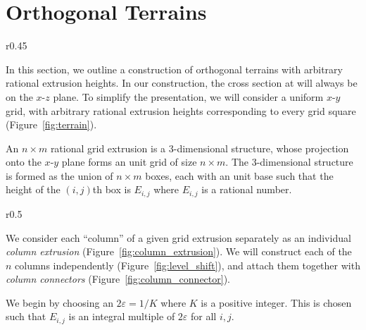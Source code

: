 \section{Orthogonal Terrains}
\label{sec:orthogonal_terrains}

\graphicspath{{./notebooks/}}%
\begin{wrapfigure}[7]{r}{0.45\textwidth}
    \vspace{-2.7em}
    \def\svgwidth{0.45\textwidth}
    
    \caption{Example orthogonal terrain.}
    \label{fig:terrain}
    \vspace{-1.2em}
\end{wrapfigure}
In this section, we outline a construction of orthogonal terrains with arbitrary rational extrusion heights.
In our construction, the cross section at will always be on the $x$-$z$ plane.
To simplify the presentation, we will consider a uniform $x$-$y$ grid,
with arbitrary rational extrusion heights corresponding to every grid square (Figure~\ref{fig:terrain}).
\begin{definition}
An $n\times m$ rational grid extrusion is a 3-dimensional structure,
whose projection onto the $x$-$y$ plane forms an unit grid of size $n\times m$.
The 3-dimensional structure is formed as the union of $n\times m$ boxes, each with an unit base
such that the height of the $(i,j)$th box is $E_{i,j}$ where $E_{i, j}$ is a rational number.
\end{definition}

\graphicspath{{./figures/}}
\begin{wrapfigure}[7]{r}{0.5\textwidth}
    \vspace{-2.2em}
    \def\svgwidth{0.5\textwidth}
    \caption{Column extrusion with heights $\left\{ 0,1,3,1,2,0\right\}$.}
    \label{fig:column_extrusion}
    \vspace{-0.8em}
\end{wrapfigure}
We consider each ``column'' of a given grid extrusion separately
as an individual \emph{column extrusion} (Figure~\ref{fig:column_extrusion}).
We will construct each of the $n$ columns independently (Figure~\ref{fig:level_shift}),
and attach them together with \emph{column connectors} (Figure~\ref{fig:column_connector}).

We begin by choosing an $2\varepsilon=1/K$ where $K$ is a positive integer.
This is chosen such that $E_{i,j}$ is an integral multiple of $2\varepsilon$ for all $i,j$.






%
%
